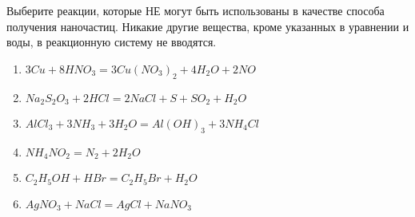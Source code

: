 
Выберите реакции, которые НЕ могут быть
использованы в качестве способа получения наночастиц. Никакие другие вещества,
кроме указанных в уравнении и воды, в реакционную систему не вводятся.

\begin{enumerate}
    \item $3Cu +8HNO_3 = 3Cu(NO_3)_2 + 4H_2O + 2NO$
    \item $Na_2S_2O_3 + 2HCl = 2NaCl + S + SO_2 +H_2O$
    \item $AlCl_3 + 3NH_3 + 3H_2O  = Al(OH)_3 + 3NH_4Cl$
    \item $NH_4NO_2 = N_2 + 2H_2O$
    \item $C_2H_5OH + HBr = C_2H_5Br + H_2O$
    \item $AgNO_3 + NaCl = AgCl + NaNO_3$
\end{enumerate}



